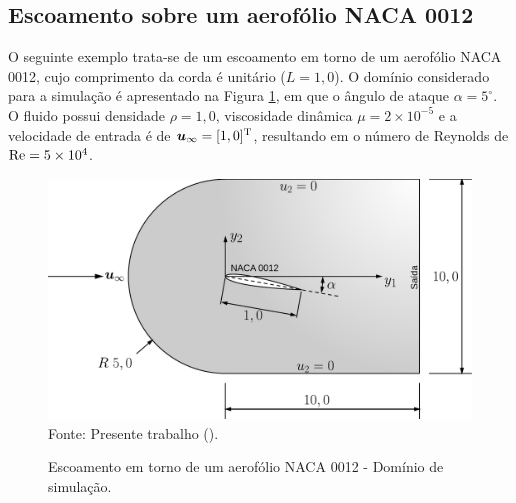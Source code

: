\subsection{Escoamento sobre um aerofólio NACA 0012} \label{ex:NACA0012}

O seguinte exemplo trata-se de um escoamento em torno de um aerofólio NACA 0012, cujo comprimento da corda é unitário ($L=1,0$). O domínio considerado para a simulação é apresentado na Figura \ref{fig:NACA0012}, em que o ângulo de ataque $\alpha=5^{\circ}$. O fluido possui densidade $\rho=1,0$, viscosidade dinâmica $\mu=2\times10^{-5}$ e a velocidade de entrada é de $\boldsymbol{u}_\infty=[1,0]^\mathrm{T}$, resultando em o número de Reynolds de $\mathrm{Re}=5\times10^4$.

\begin{figure}[h!]
    \centering
    \caption{Escoamento em torno de um aerofólio NACA 0012 - Domínio de simulação.}
    \includegraphics[width=.7\linewidth]{Figuras/NACA0012/NACA0012.pdf}
    \\Fonte: Presente trabalho (\the\year).
    \label{fig:NACA0012}
\end{figure}

